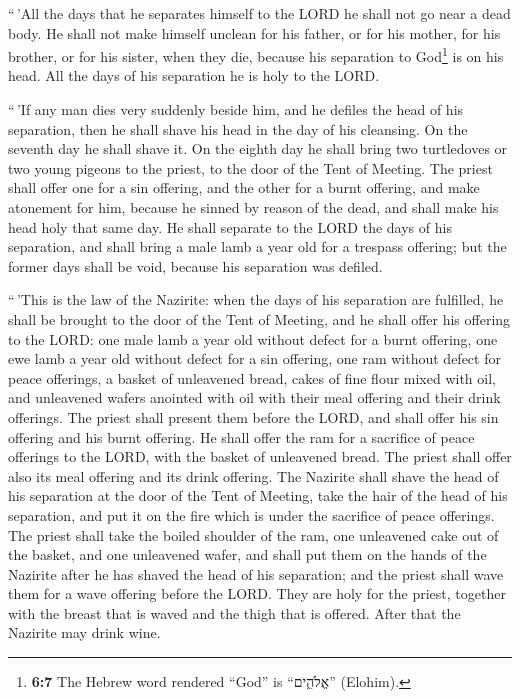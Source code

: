  ``\,'All the days that he separates himself to the LORD
he shall not go near a dead body.  He shall not make
himself unclean for his father, or for his mother, for his brother, or
for his sister, when they die, because his separation to God\footnote{\textbf{6:7}
  The Hebrew word rendered ``God'' is ``אֱלֹהִ֑ים'' (Elohim).} is on his
head.  All the days of his separation he is holy to the
LORD.

 ``\,'If any man dies very suddenly beside him, and he
defiles the head of his separation, then he shall shave his head in the
day of his cleansing. On the seventh day he shall shave it.
 On the eighth day he shall bring two turtledoves or two
young pigeons to the priest, to the door of the Tent of Meeting.
 The priest shall offer one for a sin offering, and the
other for a burnt offering, and make atonement for him, because he
sinned by reason of the dead, and shall make his head holy that same
day.  He shall separate to the LORD the days of his
separation, and shall bring a male lamb a year old for a trespass
offering; but the former days shall be void, because his separation was
defiled.

 ``\,'This is the law of the Nazirite: when the days of
his separation are fulfilled, he shall be brought to the door of the
Tent of Meeting,  and he shall offer his offering to the
LORD: one male lamb a year old without defect for a burnt offering, one
ewe lamb a year old without defect for a sin offering, one ram without
defect for peace offerings,  a basket of unleavened
bread, cakes of fine flour mixed with oil, and unleavened wafers
anointed with oil with their meal offering and their drink offerings.
 The priest shall present them before the LORD, and shall
offer his sin offering and his burnt offering.  He shall
offer the ram for a sacrifice of peace offerings to the LORD, with the
basket of unleavened bread. The priest shall offer also its meal
offering and its drink offering.  The Nazirite shall
shave the head of his separation at the door of the Tent of Meeting,
take the hair of the head of his separation, and put it on the fire
which is under the sacrifice of peace offerings.  The
priest shall take the boiled shoulder of the ram, one unleavened cake
out of the basket, and one unleavened wafer, and shall put them on the
hands of the Nazirite after he has shaved the head of his separation;
 and the priest shall wave them for a wave offering
before the LORD. They are holy for the priest, together with the breast
that is waved and the thigh that is offered. After that the Nazirite may
drink wine.

